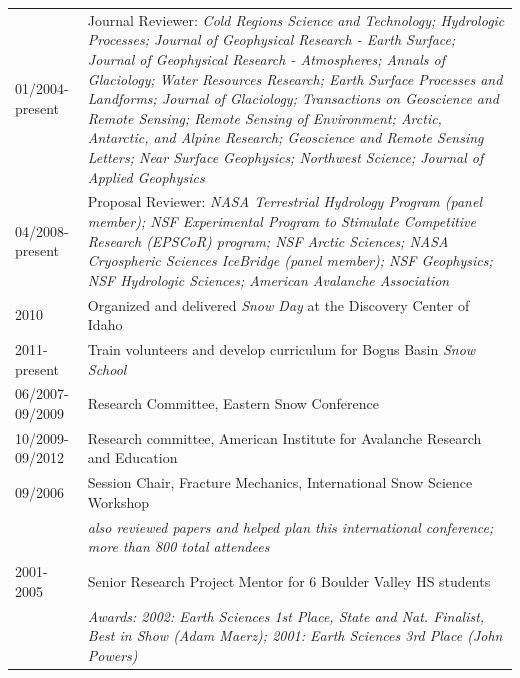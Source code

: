 \documentclass[11pt]{article}
\begin{document}
\begin{longtable}{p{1.2in}|p{5.7in}}
01/2004-present & Journal Reviewer: \textit{Cold Regions Science and Technology; 
Hydrologic Processes; Journal of Geophysical Research - Earth Surface; Journal of 
Geophysical Research - Atmospheres; Annals of Glaciology; Water Resources Research; 
Earth Surface Processes and Landforms; Journal of Glaciology; Transactions on Geoscience
and Remote Sensing; Remote Sensing of Environment; Arctic, Antarctic, and Alpine Research;
Geoscience and Remote Sensing Letters; Near Surface Geophysics; Northwest Science; Journal of Applied Geophysics} \\

04/2008-present & Proposal Reviewer: \textit{NASA Terrestrial Hydrology Program (panel member); 
NSF Experimental Program to Stimulate Competitive Research (EPSCoR) program; NSF Arctic Sciences; NASA Cryospheric Sciences IceBridge (panel member); NSF Geophysics; NSF Hydrologic Sciences; American Avalanche Association} \\

2010 & Organized and delivered \textit{Snow Day} at the Discovery Center of Idaho \\
2011-present & Train volunteers and develop curriculum for Bogus Basin \textit{Snow School} \\
06/2007-09/2009 & Research Committee, Eastern Snow Conference \\
10/2009-09/2012 & Research committee, American Institute for Avalanche Research and Education \\
09/2006 & Session Chair, Fracture Mechanics, International Snow Science Workshop \\
& \textit{also reviewed papers and helped plan this international conference; 
more than 800 total attendees}  \\
2001-2005 & Senior Research Project Mentor for 6 Boulder Valley HS students \\
& \textit{Awards: 2002: Earth Sciences 1st Place, State and Nat. Finalist, Best in Show 
(Adam Maerz); 2001: Earth Sciences 3rd Place (John Powers)} \\
\end{longtable}
\endgroup
\end{document}

